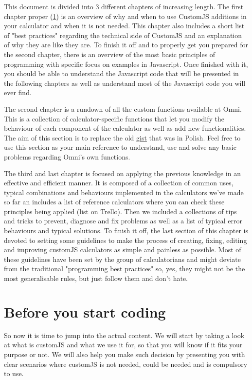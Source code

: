 \documentclass[11pt,a4paper,oldfontcommands]{memoir}
\begin{document}
This document is divided into 3 different chapters of increasing length. The first chapter proper (\ref{chap:b4}) is an overview of why and when to use CustomJS additions in your calculator and when it is not needed. This chapter also includes a short list of "best practices" regarding the technical side of CustomJS and an explanation of why they are like they are. To finish it off and to properly get you prepared for the second chapter, there is an overview of the most basic principles of programming with specific focus on examples in Javascript. Once finished with it, you should be able to understand the Javascript code that will be presented in the following chapters as well as understand most of the Javascript code you will ever find.

The second chapter is a rundown of all the custom functions available at Omni. This is a collection of calculator-specific functions that let you modify the behaviour of each component of the calculator as well as add new functionalities. The aim of this section is to replace the old \href{https://gist.github.com/trojanowski/1fd347f2b0cba5bd7ce3deb5fd3566af}{gist} that was in Polish. Feel free to use this section as your main reference to understand, use and solve any basic problems regarding Omni's own functions. 

The third and last chapter is focused on applying the previous knowledge in an effective and efficient manner. It is composed of a collection of common uses, typical combinations and behaviours implemented in the calculators we've made so far an includes a list of reference calculators where you can check these principles being applied (list on Trello). Then we included a collections of tips and tricks to prevent, diagnose and fix problems as well as a list of typical error behaviours and typical solutions. To finish it off, the last section of this chapter is devoted to setting some guidelines to make the process of creating, fixing, editing and improving customJS calculators as simple and painless as possible. Most of these guidelines have been set by the group of calculatorians and might deviate from the traditional "programming best practices" so, yes, they might not be the most generalisable rules, but just follow them and don't hate. 



\chapter{Before you start coding}
    \label{chap:b4}
So now it is time to jump into the actual content. We will start by taking a look at what is customJS and what we use it for, so that you will know if it fits your purpose or not. We will also help you make such decision by presenting you with clear scenarios where customJS is not needed, could be needed and is compulsory to use. 
\end{document}
